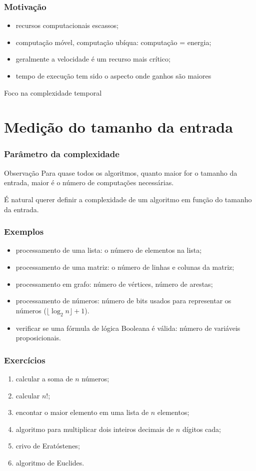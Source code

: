 \documentclass{beamer}
\begin{document}
\begin{frame}
  \frametitle{Motivação}

  \begin{itemize}
  \item recursos computacionais escassos;
  \item computação móvel, computação ubíqua: computação = energia;
  \item geralmente a velocidade é um recurso mais crítico;
  \item tempo de execução tem sido o aspecto onde ganhos são maiores
  \end{itemize}
  \pause
  \alert{Foco na complexidade temporal}
\end{frame}

\section{Medição do tamanho da entrada}

\begin{frame}
\frametitle{Parâmetro da complexidade}

\begin{block}{Observação}
Para quase todos os algoritmos, quanto maior for o tamanho da entrada, maior
é o número de computações necessárias.
\end{block}

É natural querer definir a complexidade de um algoritmo em função do tamanho da
entrada.
\end{frame}

\begin{frame}
\frametitle{Exemplos}

\begin{itemize}
\item processamento de uma lista: o número de elementos na lista;
\item processamento de uma matriz: o número de linhas e colunas da matriz;
\item processamento em grafo: número de vértices, número de arestas;
\item processamento de números: número de bits usados para representar os
  números ($\lfloor \log_2 n \rfloor + 1$).
\item verificar se uma fórmula de lógica Booleana é válida: número de variáveis
  proposicionais.
\end{itemize}

\end{frame}

\begin{frame}
\frametitle{Exercícios}
\begin{enumerate}
\item calcular a soma de $n$ números;
\item calcular $n!$;
\item encontar o maior elemento em uma lista de $n$ elementos;
\item algoritmo para multiplicar dois inteiros decimais de $n$ dígitos cada;
\item crivo de Eratóstenes;
\item algoritmo de Euclides.
\end{enumerate}
\end{frame}
\end{document}
